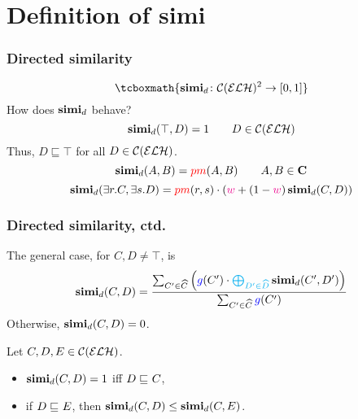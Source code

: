 \documentclass[smaller, dvipsnames]{beamer}
\begin{document}
\section{Definition of simi}

\begin{frame}
  \frametitle{Directed similarity}

  \begin{equation}
  \tcboxmath{\simi_d \colon \celh^2 \to [0,1]}
  \end{equation}
  How does \(\operatorname{\mathbf{simi}}_d\) behave?
  \pause
  \begin{equation}
    \operatorname{\mathbf{simi}}_d(\top,D) = 1 \qquad D \in \mathcal{C}(\mathcal{ELH})
  \end{equation}
  Thus, \(D \sqsubseteq \top\) for all \(D \in \mathcal{C}(\mathcal{ELH})\).
  \pause
  \begin{equation}
    \operatorname{\mathbf{simi}}_d(A,B) = \textcolor{red}{pm}(A,B) \qquad A,B \in \mathbf{C}
  \end{equation}
  \begin{equation}
    \operatorname{\mathbf{simi}}_d(\exists{}r.C,\exists{}s.D) =
    \textcolor{red}{pm}(r,s) \cdot 
    \left(\textcolor{magenta}{w} + 
    (1-\textcolor{magenta}{w})\operatorname{\mathbf{simi}}_d(C,D)\right)
  \end{equation}
\end{frame}

\begin{frame}
  \frametitle{Directed similarity, ctd.}
  The general case, for \(C,D \ne \top\), is
  \begin{equation}
    \simi_d(C,D) =
    \frac{\sum_{C^\prime \in \atom{C}}\left(\myg(C^\prime) \cdot \textcolor{cyan}{\bigoplus_{D^\prime \in \atom{D}}} \simi_d(C^\prime, D^\prime)\right)}%
    {\sum_{C^\prime \in \atom{C}}\myg(C^\prime)}
  \end{equation}
  Otherwise, \(\operatorname{\mathbf{simi}}_d(C,D) = 0\).
  \pause
  \begin{lemma}
    Let \(C,D,E \in \mathcal{C}(\mathcal{ELH})\).
    \begin{itemize}
      \item \(\operatorname{\mathbf{simi}}_d(C,D) = 1\) iff \(D \sqsubseteq_{\mathcal{}} C\),
      \item if \(D \sqsubseteq_{\mathcal{}} E\), then \(\operatorname{\mathbf{simi}}_d(C,D) \le \operatorname{\mathbf{simi}}_d(C,E)\).
    \end{itemize}
  \end{lemma}
\end{frame}
\end{document}

